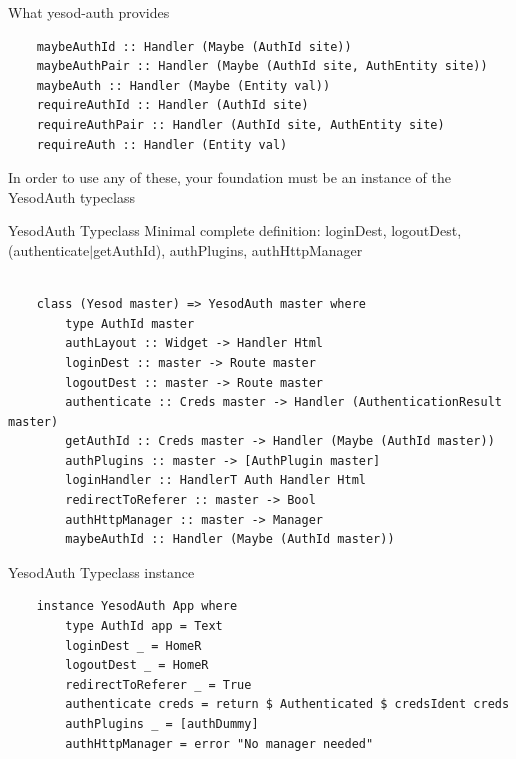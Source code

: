 \documentclass[pdf]{beamer}
\begin{document}
\begin{frame}[fragile]{What yesod-auth provides}
  \begin{verbatim}
    maybeAuthId :: Handler (Maybe (AuthId site))
    maybeAuthPair :: Handler (Maybe (AuthId site, AuthEntity site))
    maybeAuth :: Handler (Maybe (Entity val))
    requireAuthId :: Handler (AuthId site)
    requireAuthPair :: Handler (AuthId site, AuthEntity site)
    requireAuth :: Handler (Entity val)
  \end{verbatim}
  \pause
  In order to use any of these, your foundation must be an instance of
  the YesodAuth typeclass
\end{frame}

\begin{frame}[fragile]{YesodAuth Typeclass}
  Minimal complete definition: loginDest, logoutDest,
  (authenticate$|$getAuthId), authPlugins, authHttpManager \\
  \\
  \begin{verbatim}
    class (Yesod master) => YesodAuth master where
        type AuthId master
        authLayout :: Widget -> Handler Html
        loginDest :: master -> Route master
        logoutDest :: master -> Route master
        authenticate :: Creds master -> Handler (AuthenticationResult master)
        getAuthId :: Creds master -> Handler (Maybe (AuthId master))
        authPlugins :: master -> [AuthPlugin master]
        loginHandler :: HandlerT Auth Handler Html
        redirectToReferer :: master -> Bool
        authHttpManager :: master -> Manager
        maybeAuthId :: Handler (Maybe (AuthId master))
  \end{verbatim}
\end{frame}

\begin{frame}[fragile]{YesodAuth Typeclass instance}
  \begin{verbatim}
    instance YesodAuth App where
        type AuthId app = Text
        loginDest _ = HomeR
        logoutDest _ = HomeR
        redirectToReferer _ = True
        authenticate creds = return $ Authenticated $ credsIdent creds
        authPlugins _ = [authDummy]
        authHttpManager = error "No manager needed"
  \end{verbatim}
\end{frame}
\end{document}
